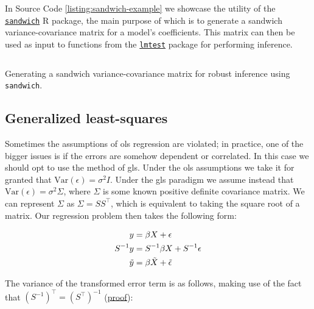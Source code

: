 \documentclass{report}
\begin{document}
In Source Code \ref{listing:sandwich-example} we showcase the utility of the \href{https://cran.r-project.org/web/packages/sandwich/index.html}{\texttt{sandwich}} R package, the main purpose of which is to generate a sandwich variance-covariance matrix for a model's coefficients. This matrix can then be used as input to functions from the \href{https://cran.r-project.org/web/packages/lmtest/index.html}{\texttt{lmtest}} package for performing inference. 

\begin{listing}[h!]
\inputminted{r}{Example-Code/sandwich_linear_regression.R}
\caption{Generating a sandwich variance-covariance matrix for robust inference using \texttt{sandwich}.}
\label{listing:sandwich-example}
\end{listing}

\subsection{Generalized least-squares}

Sometimes the assumptions of \gls{ols} regression are violated; in practice, one of the bigger issues is if the errors are somehow dependent or correlated. In this case we should opt to use the method of \gls{gls}. Under the \gls{ols} assumptions we take it for granted that $\text{Var}(\epsilon) = \sigma^2 I$. Under the \gls{gls} paradigm we assume instead that $\text{Var}(\epsilon) = \sigma^2 \Sigma$, where $\Sigma$ is some known positive definite covariance matrix. We can represent $\Sigma$ as $\Sigma = SS^\intercal$, which is equivalent to taking the square root of a matrix. Our regression problem then takes the following form:

\begin{equation}\label{eq:ols-gls-model-form}
    \begin{aligned}
        y &= \beta X + \epsilon \\
        S^{-1} y &= S^{-1} \beta X + S^{-1} \epsilon \\
        \Tilde{y} &= \beta \Tilde{X} + \Tilde{\epsilon} \\
    \end{aligned}
\end{equation}

The variance of the transformed error term is as follows, making use of the fact that $\left(S^{-1}\right)^\intercal = \left(S^\intercal\right)^{-1}$ (\href{https://math.stackexchange.com/questions/340233/transpose-of-inverse-vs-inverse-of-transpose}{proof}):
\end{document}
